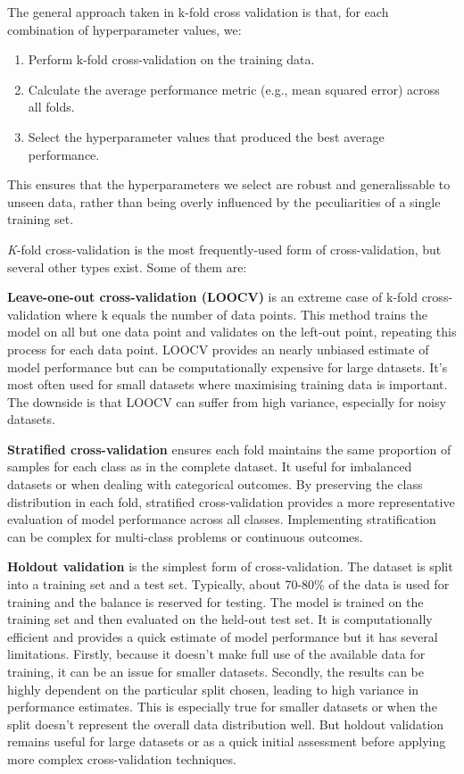 \documentclass[
  letterpaper,
]{book}
\providecommand{\tightlist}{%
  \setlength{\itemsep}{0pt}\setlength{\parskip}{0pt}}\usepackage{longtable,booktabs,array}
\begin{document}
The general approach taken in \(\text{k}\)-fold cross validation is
that, for each combination of hyperparameter values, we:

\begin{enumerate}
\def\labelenumi{\arabic{enumi}.}
\tightlist
\item
  Perform \(\text{k}\)-fold cross-validation on the training data.
\item
  Calculate the average performance metric (e.g., mean squared error)
  across all folds.
\item
  Select the hyperparameter values that produced the best average
  performance.
\end{enumerate}

This ensures that the hyperparameters we select are robust and
generalissable to unseen data, rather than being overly influenced by
the peculiarities of a single training set.

\emph{K}-fold cross-validation is the most frequently-used form of
cross-validation, but several other types exist. Some of them are:

\textbf{Leave-one-out cross-validation (LOOCV)} is an extreme case of
\(\text{k}\)-fold cross-validation where \(\text{k}\) equals the number
of data points. This method trains the model on all but one data point
and validates on the left-out point, repeating this process for each
data point. LOOCV provides an nearly unbiased estimate of model
performance but can be computationally expensive for large datasets.
It's most often used for small datasets where maximising training data
is important. The downside is that LOOCV can suffer from high variance,
especially for noisy datasets.

\textbf{Stratified cross-validation} ensures each fold maintains the
same proportion of samples for each class as in the complete dataset. It
useful for imbalanced datasets or when dealing with categorical
outcomes. By preserving the class distribution in each fold, stratified
cross-validation provides a more representative evaluation of model
performance across all classes. Implementing stratification can be
complex for multi-class problems or continuous outcomes.

\textbf{Holdout validation} is the simplest form of cross-validation.
The dataset is split into a training set and a test set. Typically,
about 70-80\% of the data is used for training and the balance is
reserved for testing. The model is trained on the training set and then
evaluated on the held-out test set. It is computationally efficient and
provides a quick estimate of model performance but it has several
limitations. Firstly, because it doesn't make full use of the available
data for training, it can be an issue for smaller datasets. Secondly,
the results can be highly dependent on the particular split chosen,
leading to high variance in performance estimates. This is especially
true for smaller datasets or when the split doesn't represent the
overall data distribution well. But holdout validation remains useful
for large datasets or as a quick initial assessment before applying more
complex cross-validation techniques.
\end{document}
